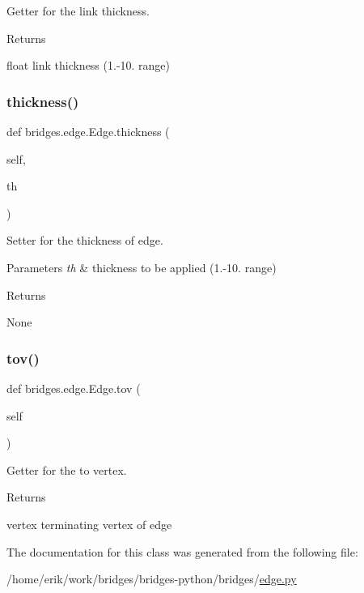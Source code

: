 Getter for the link thickness. 

\begin{DoxyReturn}{Returns}


float link thickness (1.-\/10. range) 
\end{DoxyReturn}
\mbox{\label{classbridges_1_1edge_1_1_edge_a3137a2498d08d998471efde3bc1db1b4}} 
\subsubsection{\texorpdfstring{thickness()}{thickness()}\hspace{0.1cm}{\footnotesize\ttfamily [2/2]}}
{\footnotesize\ttfamily def bridges.\+edge.\+Edge.\+thickness (\begin{DoxyParamCaption}\item[{}]{self,  }\item[{}]{th }\end{DoxyParamCaption})}



Setter for the thickness of edge. 


\begin{DoxyParams}{Parameters}
{\em th} & thickness to be applied (1.-\/10. range) \\
\hline
\end{DoxyParams}
\begin{DoxyReturn}{Returns}


None 
\end{DoxyReturn}
\mbox{\label{classbridges_1_1edge_1_1_edge_a70e81381eaa6abafd0c40962326351a9}} 
\subsubsection{\texorpdfstring{tov()}{tov()}}
{\footnotesize\ttfamily def bridges.\+edge.\+Edge.\+tov (\begin{DoxyParamCaption}\item[{}]{self }\end{DoxyParamCaption})}



Getter for the to vertex. 

\begin{DoxyReturn}{Returns}


vertex terminating vertex of edge 
\end{DoxyReturn}


The documentation for this class was generated from the following file\+:\begin{DoxyCompactItemize}
\item 
/home/erik/work/bridges/bridges-\/python/bridges/\hyperlink{edge_8py}{edge.\+py}\end{DoxyCompactItemize}

